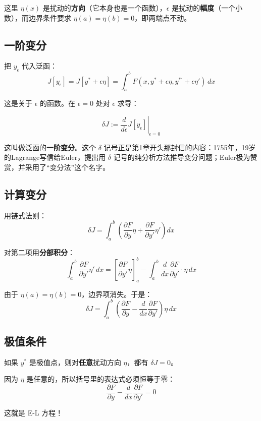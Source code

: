 这里 $\eta(x)$ 是扰动的\textbf{方向}（它本身也是一个函数），$\epsilon$ 是扰动的\textbf{幅度}（一个小数），而边界条件要求 $\eta(a) = \eta(b) = 0$，即两端点不动。

\subsection{一阶变分}

把 $y_\epsilon$ 代入泛函：
\[
J[y_\epsilon] = J[y^* + \epsilon\eta] = \int_a^b F(x, y^* + \epsilon\eta, y^{*\prime} + \epsilon\eta') \, dx
\]

这是关于 $\epsilon$ 的函数。在 $\epsilon = 0$ 处对 $\epsilon$ 求导：

\[
\delta J := \left. \frac{d}{d\epsilon} J[y_\epsilon] \right|_{\epsilon=0}
\]

这叫做泛函的\textbf{一阶变分}。这个 $\delta$ 记号正是第1章开头那封信的内容：1755年，19岁的Lagrange写信给Euler，提出用 $\delta$ 记号的纯分析方法推导变分问题；Euler极为赞赏，并采用了“变分法”这个名字。

\subsection{计算变分}

用链式法则：
\[
\delta J = \int_a^b \left( \frac{\partial F}{\partial y} \eta + \frac{\partial F}{\partial y'} \eta' \right) dx
\]

对第二项用\textbf{分部积分}：
\[
\int_a^b \frac{\partial F}{\partial y'} \eta' \, dx = \left[ \frac{\partial F}{\partial y'} \eta \right]_a^b - \int_a^b \frac{d}{dx}\frac{\partial F}{\partial y'} \cdot \eta \, dx
\]

由于 $\eta(a) = \eta(b) = 0$，边界项消失。于是：
\[
\delta J = \int_a^b \left( \frac{\partial F}{\partial y} - \frac{d}{dx}\frac{\partial F}{\partial y'} \right) \eta \, dx
\]

\subsection{极值条件}

如果 $y^*$ 是极值点，则对\textbf{任意}扰动方向 $\eta$，都有 $\delta J = 0$。

因为 $\eta$ 是任意的，所以括号里的表达式必须恒等于零：
\[
\frac{\partial F}{\partial y} - \frac{d}{dx}\frac{\partial F}{\partial y'} = 0
\]

这就是 E-L 方程！

